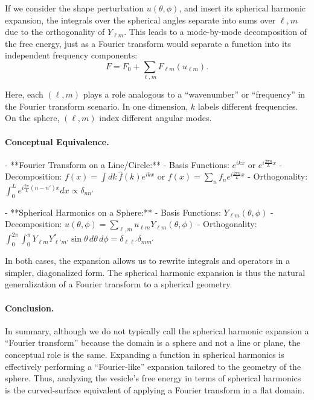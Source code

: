 \documentclass[12pt,a4paper]{article}
\begin{document}
If we consider the shape perturbation $u(\theta,\phi)$, and insert its spherical harmonic expansion, the integrals over the spherical angles separate into sums over $\ell,m$ due to the orthogonality of $Y_{\ell m}$. This leads to a mode-by-mode decomposition of the free energy, just as a Fourier transform would separate a function into its independent frequency components:
\begin{equation}
F = F_0 + \sum_{\ell,m} F_{\ell m}(u_{\ell m}).
\end{equation}

Here, each $(\ell,m)$ plays a role analogous to a “wavenumber” or “frequency” in the Fourier transform scenario. In one dimension, $k$ labels different frequencies. On the sphere, $(\ell,m)$ index different angular modes.

\paragraph{Conceptual Equivalence.}

- **Fourier Transform on a Line/Circle:**
  - Basis Functions: $e^{ikx}$ or $e^{i\frac{2\pi n}{L}x}$
  - Decomposition: $f(x) = \int dk\, \hat{f}(k)e^{ikx}$ or $f(x)=\sum_n f_n e^{i\frac{2\pi n}{L}x}$
  - Orthogonality: $\int_0^{L} e^{i\frac{2\pi}{L}(n-n')x} dx \propto \delta_{nn'}$

- **Spherical Harmonics on a Sphere:**
  - Basis Functions: $Y_{\ell m}(\theta,\phi)$
  - Decomposition: $u(\theta,\phi) = \sum_{\ell,m} u_{\ell m} Y_{\ell m}(\theta,\phi)$
  - Orthogonality: $\int_0^{2\pi}\int_0^\pi Y_{\ell m}Y_{\ell' m'}^*\sin\theta\, d\theta\, d\phi = \delta_{\ell\ell'}\delta_{mm'}$

In both cases, the expansion allows us to rewrite integrals and operators in a simpler, diagonalized form. The spherical harmonic expansion is thus the natural generalization of a Fourier transform to a spherical geometry.

\paragraph{Conclusion.}

In summary, although we do not typically call the spherical harmonic expansion a “Fourier transform” because the domain is a sphere and not a line or plane, the conceptual role is the same. Expanding a function in spherical harmonics is effectively performing a “Fourier-like” expansion tailored to the geometry of the sphere. Thus, analyzing the vesicle’s free energy in terms of spherical harmonics is the curved-surface equivalent of applying a Fourier transform in a flat domain.
\end{document}
